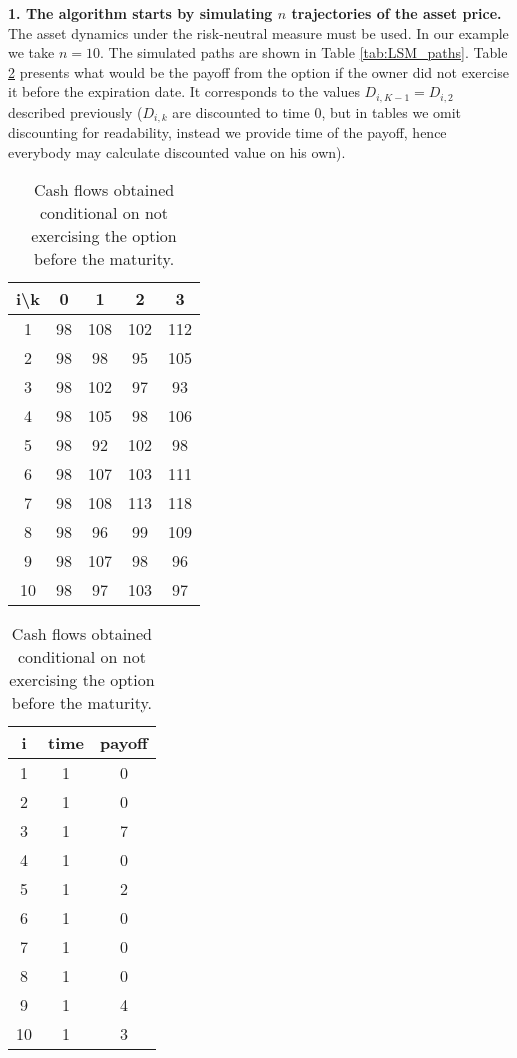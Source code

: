 \documentclass[a4paper,11pt, twoside]{book}
\theoremstyle{definition}
\theoremstyle{remark}
\newcounter{example}[chapter]
\begin{document}
\noindent \textbf{1. The algorithm starts by simulating $n$ trajectories of the asset price.} The asset dynamics under the risk-neutral measure must be used. In our example we take $n=10$. The simulated paths are shown in Table \ref{tab:LSM_paths}. Table \ref{tab:LSM_cashflows_t3} presents what would be the payoff from the option if the owner did not exercise it before the expiration date. It corresponds to the values $D_{i,K-1} = D_{i,2}$ described previously ($D_{i,k}$ are discounted to time 0, but in tables we omit discounting for readability, instead we provide time of the payoff, hence everybody may calculate discounted value on his own).
\begin{table}[h]
 \parbox{.45\linewidth} {
   \centering
   \caption{Paths simulated under the risk-neutral measure.}
   \label{tab:LSM_paths}
   \begin{tabular} {||c |c |c |c |c ||}  
    \hline 
    i\textbackslash k & 0   &  1  &  2  &  3  \\ \hline \hline
    1 & 98 & 108 & 102 & 112 \\ \hline 
    2 & 98 & 98 & 95 & 105 \\ \hline 
    3 & 98 & 102 & 97 & 93 \\ \hline 
    4 & 98 & 105 & 98 & 106 \\ \hline 
    5 & 98 & 92 & 102 & 98 \\ \hline 
    6 & 98 & 107 & 103 & 111 \\ \hline 
    7 & 98 & 108 & 113 & 118 \\ \hline 
    8 & 98 & 96 & 99 & 109 \\ \hline 
    9 & 98 & 107 & 98 & 96 \\ \hline 
    10 & 98 & 97 & 103 & 97 \\ \hline 
   \end{tabular} 
 }
 \qquad 
 \parbox{.45\linewidth} {
  \centering
  \caption{Cash flows obtained conditional on not exercising the option before the maturity.}
  \label{tab:LSM_cashflows_t3}
  \begin{tabular}{|| c | c | c ||}
    \hline 
    i  & time  &  payoff \\ \hline \hline
    1  & 1     &      0 \\ \hline
    2  & 1     &      0 \\ \hline
    3  & 1     &      7 \\ \hline
    4  & 1     &      0 \\ \hline
    5  & 1     &      2 \\ \hline
    6  & 1     &      0 \\ \hline
    7  & 1     &      0 \\ \hline
    8  & 1     &      0 \\ \hline
    9  & 1     &      4 \\ \hline
    10  & 1     &      3 \\ \hline
  \end{tabular}
}
\end{table}
\end{document}
